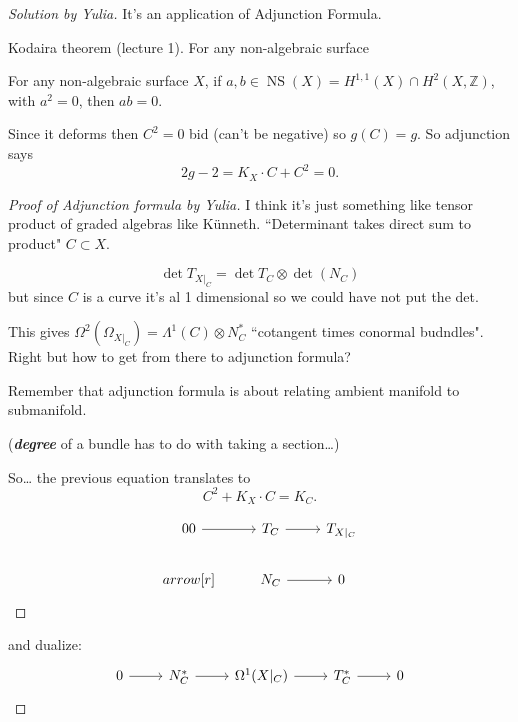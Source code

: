 \begin{proof}[Solution by Yulia]\leavevmode
It's an application of Adjunction Formula.

\begin{remark}\leavevmode
Kodaira theorem (lecture 1). For any non-algebraic surface
\end{remark}
\begin{thm}[Kodaira]\leavevmode
For any non-algebraic surface \(X\), if \(a,b \in \operatorname{NS}(X)= H^{1,1}(X)\cap H^{2}(X,\mathbb{Z})\), with \(a^2=0\), then \(ab=0\).
\end{thm}

Since it deforms  then \(C^2=0\) bid (can't be negative) so \(g(C)=g\). So adjunction says
 \[2g-2=K_X\cdot C+ C^2=0.\]

\begin{proof}[Proof of Adjunction formula by Yulia]\leavevmode
{\color{6}I think it's just something like tensor product of graded algebras like Künneth. ``Determinant takes direct sum to product"} \(C \subset X\).

\[\det T_{X|_{C}}=\det T_C \otimes \det (N_C)\]
but since $C$ is a curve it's al 1 dimensional so we could have not put the det.

This gives \(\Omega^{2}(\Omega_{X|_{C}})=\Lambda^{1}(C) \otimes N^*_C\)
``cotangent times conormal budndles". Right but how to get from there to adjunction formula?

Remember that adjunction formula is about relating ambient manifold to submanifold.

(\textit{\textbf{degree}} of a bundle has to do with taking a section…)

So… the previous equation translates to
\[C^2 + K_X \cdot C = K_C.\]





\[\begin{tikzcd}0\arrow[r]0&T_C\arrow[r]&T_{X|_{C}}\\arrow[r]&N_C\arrow[r]&0\end{tikzcd}\]
\end{proof}
and dualize:
\[\begin{tikzcd}0\arrow[r]&N_C^*\arrow[r]&\Omega^{1}(X|_{C})\arrow[r]&T^*_C\arrow[r]&0\end{tikzcd}\]
\end{proof}



